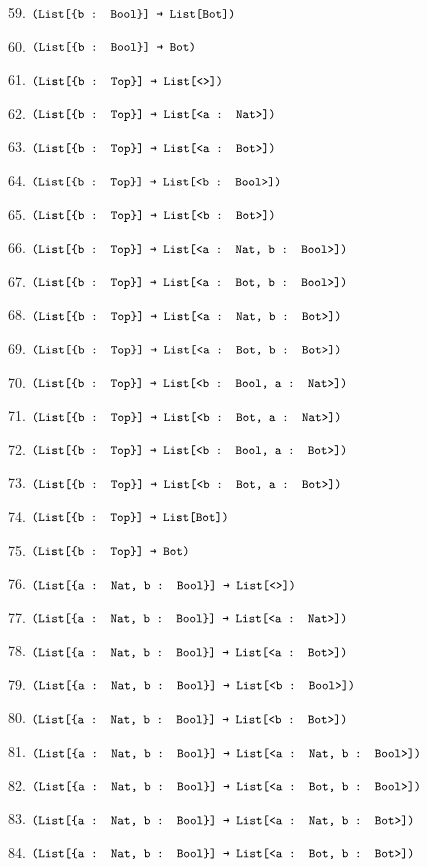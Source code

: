 \documentclass[dvipsnames]{article}
\let\codeOrig\code
\renewcommand{\code}[2][]{%
  \ifmmode
    \if\relax\detokenize{#1}\relax
      \mathchoice{\mbox{\normalfont\small\ttfamily #2}}{\mbox{\normalfont\small\ttfamily #2}}{\mbox{\normalfont\small\ttfamily #2}}{\mbox{\normalfont\small\ttfamily #2}}%
    \else
      \mathchoice{\mbox{\normalfont\small\ttfamily #2}}{\mbox{\normalfont\small\ttfamily #2}}{\mbox{\normalfont\small\ttfamily #2}}{\mbox{\normalfont\small\ttfamily #2}}%
    \fi
  \else
    \codeOrig[#1]{#2}%
  \fi}
\begin{document}
\begin{enumerate}
      59. $\code{(List[\{b : Bool\}] → List[Bot])}$

      60. $\code{(List[\{b : Bool\}] → Bot)}$

      61. $\code{(List[\{b : Top\}] → List[<>])}$

      62. $\code{(List[\{b : Top\}] → List[<a : Nat>])}$

      63. $\code{(List[\{b : Top\}] → List[<a : Bot>])}$

      64. $\code{(List[\{b : Top\}] → List[<b : Bool>])}$

      65. $\code{(List[\{b : Top\}] → List[<b : Bot>])}$

      66. $\code{(List[\{b : Top\}] → List[<a : Nat, b : Bool>])}$

      67. $\code{(List[\{b : Top\}] → List[<a : Bot, b : Bool>])}$

      68. $\code{(List[\{b : Top\}] → List[<a : Nat, b : Bot>])}$

      69. $\code{(List[\{b : Top\}] → List[<a : Bot, b : Bot>])}$

      70. $\code{(List[\{b : Top\}] → List[<b : Bool, a : Nat>])}$

      71. $\code{(List[\{b : Top\}] → List[<b : Bot, a : Nat>])}$

      72. $\code{(List[\{b : Top\}] → List[<b : Bool, a : Bot>])}$

      73. $\code{(List[\{b : Top\}] → List[<b : Bot, a : Bot>])}$

      74. $\code{(List[\{b : Top\}] → List[Bot])}$

      75. $\code{(List[\{b : Top\}] → Bot)}$

      76. $\code{(List[\{a : Nat, b : Bool\}] → List[<>])}$

      77. $\code{(List[\{a : Nat, b : Bool\}] → List[<a : Nat>])}$

      78. $\code{(List[\{a : Nat, b : Bool\}] → List[<a : Bot>])}$

      79. $\code{(List[\{a : Nat, b : Bool\}] → List[<b : Bool>])}$

      80. $\code{(List[\{a : Nat, b : Bool\}] → List[<b : Bot>])}$

      81. $\code{(List[\{a : Nat, b : Bool\}] → List[<a : Nat, b : Bool>])}$

      82. $\code{(List[\{a : Nat, b : Bool\}] → List[<a : Bot, b : Bool>])}$

      83. $\code{(List[\{a : Nat, b : Bool\}] → List[<a : Nat, b : Bot>])}$

      84. $\code{(List[\{a : Nat, b : Bool\}] → List[<a : Bot, b : Bot>])}$


\end{enumerate}
\end{document}
